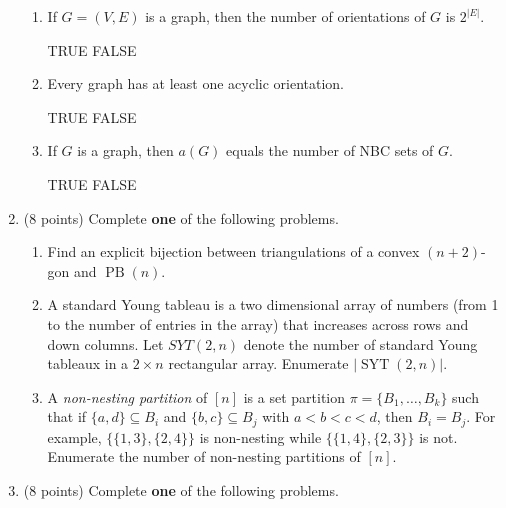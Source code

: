 \documentclass[11pt]{article}
\theoremstyle{definition}
\DeclareMathOperator{\SYT}{SYT}
\DeclareMathOperator{\PB}{PB}
\begin{document}
\begin{enumerate}
\begin{enumerate}
\item If $G=(V,E)$ is a graph, then the number of orientations of $G$ is $2^{|E|}$.

\smallskip

TRUE \qquad FALSE

\item Every graph has at least one acyclic orientation.

\smallskip

TRUE \qquad FALSE

\item If $G$ is a graph, then $a(G)$ equals the number of NBC sets of $G$.

\smallskip

TRUE \qquad FALSE

\end{enumerate}

\item (8 points) Complete \textbf{one} of the following problems.

\begin{enumerate}

\item Find an explicit bijection between triangulations of a convex $(n+2)$-gon and $\PB(n)$.


\item A standard Young tableau is a two dimensional array of numbers (from 1 to the number of entries in the array) that increases across rows and down columns. Let $SYT(2, n)$ denote the number of standard Young tableaux in a $2\times n$ rectangular array. Enumerate $|\SYT(2,n)|$.

\item A \emph{non-nesting partition} of $[n]$ is a set partition $\pi=\{B_1,\ldots,B_k\}$ such that if $\{a,d\}\subseteq B_i$ and $\{b,c\}\subseteq B_j$ with $a<b<c<d$, then $B_i=B_j$.  For example, $\{\{1,3\},\{2,4\}\}$ is non-nesting while $\{\{1,4\},\{2,3\}\}$ is not.  Enumerate the number of non-nesting partitions of $[n]$.

\end{enumerate}

\item (8 points) Complete \textbf{one} of the following problems.


\end{enumerate}
\end{document}
